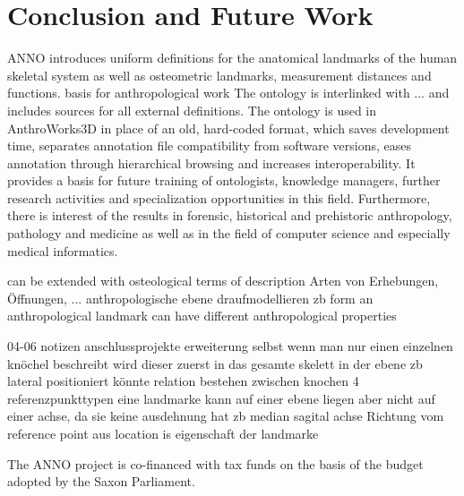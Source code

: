 \documentclass[sw]{iosart2x}
\newcommand{\aw}{AnthroWorks3D}
\begin{document}
\section{Conclusion and Future Work}
ANNO introduces uniform definitions for the anatomical landmarks of the human skeletal system as well as osteometric landmarks, measurement distances and functions.
basis for anthropological work
The ontology is interlinked with ... and includes sources for all external definitions.
The ontology is used in \aw{} in place of an old, hard-coded format, which saves development time, separates annotation file compatibility from software versions, eases annotation through hierarchical browsing and increases interoperability.
It provides a basis for future training of ontologists, knowledge managers, further research activities and specialization opportunities in this field.
Furthermore, there is interest of the results in forensic, historical and prehistoric anthropology, pathology and medicine as well as in the field of computer science and especially medical informatics.

can be extended with osteological terms of description
Arten von Erhebungen, Öffnungen, ...
anthropologische ebene draufmodellieren zb form
an anthropological landmark can have different anthropological properties

04-06 notizen
anschlussprojekte erweiterung
selbst wenn man nur einen einzelnen knöchel beschreibt wird dieser zuerst in das gesamte skelett
in der ebene zb lateral positioniert
könnte relation bestehen zwischen knochen
4 referenzpunkttypen
eine landmarke kann auf einer ebene liegen aber nicht auf einer achse, da sie keine ausdehnung hat
zb median sagital achse
Richtung vom reference point aus
location is eigenschaft der landmarke



\begin{ack}
The ANNO project is co-financed with tax funds on the basis of the budget adopted by the Saxon Parliament.
\end{ack}

\nocite{*}


\end{document}
